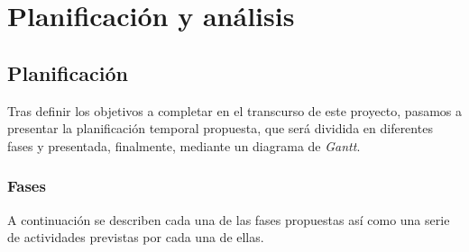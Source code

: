 \chapter{Planificación y análisis}
\label{cap:panificacion-analisis}

\section{Planificación}
\label{sec:planificacion}

Tras definir los objetivos a completar en el transcurso de este proyecto, pasamos a presentar la planificación temporal propuesta, que será dividida en diferentes fases y presentada, finalmente, mediante un diagrama de \textit{Gantt}.

\subsection{Fases}

A continuación se describen cada una de las fases propuestas así como una serie de actividades previstas por cada una de ellas.

